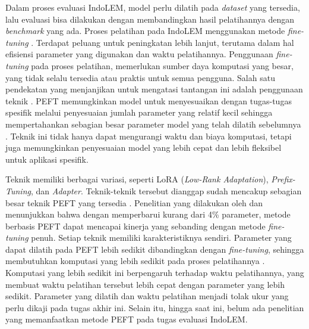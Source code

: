 Dalam proses evaluasi IndoLEM, model perlu dilatih pada \textit{dataset} yang tersedia, lalu evaluasi bisa dilakukan dengan membandingkan hasil pelatihannya dengan \textit{benchmark} yang ada. Proses pelatihan pada IndoLEM menggunakan metode \textit{fine-tuning} \parencite{indolem}. Terdapat peluang untuk peningkatan lebih lanjut, terutama dalam hal efisiensi parameter yang digunakan dan waktu pelatihannya. Penggunaan \textit{fine-tuning} pada proses pelatihan, memerlukan sumber daya komputasi yang besar, yang tidak selalu tersedia atau praktis untuk semua pengguna. Salah satu pendekatan yang menjanjikan untuk mengatasi tantangan ini adalah penggunaan teknik \PEFT. PEFT memungkinkan model untuk menyesuaikan dengan tugas-tugas spesifik melalui penyesuaian jumlah parameter yang relatif kecil sehingga mempertahankan sebagian besar parameter model yang telah dilatih sebelumnya \parencite{adapter_houlsby}. Teknik ini tidak hanya dapat mengurangi waktu dan biaya komputasi, tetapi juga memungkinkan penyesuaian model yang lebih cepat dan lebih fleksibel untuk aplikasi spesifik. 

Teknik \PEFT memiliki berbagai variasi, seperti LoRA (\textit{Low-Rank Adaptation}), \textit{Prefix-Tuning}, dan \textit{Adapter}. Teknik-teknik tersebut dianggap sudah mencakup sebagian besar teknik PEFT yang tersedia \parencite{unipelt}. Penelitian yang dilakukan oleh \citeauthor{adapter_houlsby} \parencite{adapter_houlsby} dan \citeauthor{uvpl} \parencite{uvpl} menunjukkan bahwa dengan memperbarui kurang dari 4\% parameter, metode berbasis PEFT dapat mencapai kinerja yang sebanding dengan metode \textit{fine-tuning} penuh. Setiap teknik memiliki karakteristiknya sendiri. Parameter yang dapat dilatih pada PEFT lebih sedikit dibandingkan dengan \textit{fine-tuning}, sehingga membutuhkan komputasi yang lebih sedikit pada proses pelatihannya \parencite{peft_on_plm}. Komputasi yang lebih sedikit ini berpengaruh terhadap waktu pelatihannya, yang membuat waktu pelatihan tersebut lebih cepat dengan parameter yang lebih sedikit. Parameter yang dilatih dan waktu pelatihan menjadi tolak ukur yang perlu dikaji pada tugas akhir ini. Selain itu, hingga saat ini, belum ada penelitian yang memanfaatkan metode PEFT pada tugas evaluasi IndoLEM.

